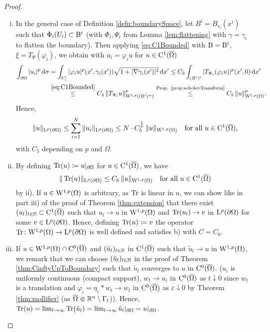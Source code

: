 \begin{proof}
\begin{enumerate}[i)]
  \item In the general case of Definition \ref{defn:boundarySpace}, let $B^i = B_{s_i}(x^i)$ such that $\Phi_i(U_i) \subset \mathrm{B}^i$ (with $\Phi_i, \Psi_i$ from Lemma \ref{lem:flattening} with $\gamma = \gamma_i$ to flatten the boundary).
    Then applying \eqref{eq:C1Bounded} with $\mathrm{B} = \mathrm{B}^i$, $\xi = T_\Psi(\varphi_i)$, we obtain with $u_i = \varphi_i u$ for $u \in \mathrm{C}^1(\overline\Omega)$
    \begin{align*}
      \int_{\partial\Omega} | u_i |^p \, {\operatorname{d}\!{\sigma}}
      &= \int_{U_i'} |\varphi_i u|^p (x', \gamma_i(x')) \sqrt{1 + |\nabla\gamma_i(x')|^2} \, {\operatorname{d}\!{x}}' 
      \leq C_3 \int_{(B^i)'} | T_{\Psi_i}(\varphi_i u) |^p (x', 0) \, {\operatorname{d}\!{x}}' \\
      &\overset{\eqref{eq:C1Bounded}}{\leq} C_4 \, \|T_{\Psi_i} u\|^p_{\mathrm{W}^{1,p}((\mathrm{B}^i)^+)} 
      \overset{\text{Prop. \ref{prop:sobolevTransform}}}{\leq} C_5 \, \|u\|^p_{\mathrm{W}^{1,p}(\Omega)}.
    \end{align*}
    Hence,
    $$
      \|u\|_{\mathrm{L}^p(\partial\Omega)} \leq \sum_{i = 1}^N \|u_i\|_{\mathrm{L}^p(\partial\Omega)} \leq N \cdot C_5^{\frac{1}{p}} \, \|u\|_{\mathrm{W}^{1,p}(\Omega)} \quad\text{for all } u \in \mathrm{C}^1(\overline\Omega),
    $$
    with $C_5$ depending on $p$ and $\Omega$.

  \item By defining $\operatorname{Tr}(u) \coloneqq u|_{\partial\Omega}$ for $u \in \mathrm{C}^1(\overline\Omega)$, we have
    $$
    \| \operatorname{Tr}(u)\|_{\mathrm{L}^p(\partial\Omega)} \leq C_6 \, \|u\|_{\mathrm{W}^{1,p}(\Omega)} \quad\text{for all } u \in \mathrm{C}^1(\overline\Omega)
    $$
    by ii).
    If $u \in \mathrm{W}^{1,p}(\Omega)$ is arbitrary, as $\operatorname{Tr}$ is linear in $u$, we can show like in part iii) of the proof of Theorem \ref{thm:extension} that there exist $(u_l)_{l \in \mathbb{N}} \subset \mathrm{C}^{1}(\overline\Omega)$ such that $u_l \to u$ in $\mathrm{W}^{1,p}(\Omega)$ and $\operatorname{Tr}(u_l) \to v$ in $\mathrm{L}^p(\partial\Omega)$ for some $v \in \mathrm{L}^p(\partial\Omega)$.
    Hence, defining $\operatorname{Tr}(u) \coloneqq v$ the operator $\operatorname{Tr} \colon \mathrm{W}^{1,p}(\Omega) \to \mathrm{L}^p(\partial\Omega)$ is well defined and satisfies b) with $C = C_6$.

  \item If $u \in \mathrm{W}^{1,p}(\Omega) \cap \mathrm{C}^0(\overline\Omega)$ and $(\tilde u_l)_{l \in \mathbb{N}}$ in $\mathrm{C}^1(\overline\Omega)$ such that $\tilde u_l \to u$ in $\mathrm{W}^{1,p}(\Omega)$, we remark that we can choose $(\tilde u_l)_{l \in \mathbb{N}}$ in the proof of Theorem \ref{thm:CinftyUpToBoundary} such that $\tilde u_l$ converges to $u$ in $\mathrm{C}^0(\overline\Omega)$.
    ($u_i$ is uniformly continuous (compact support), $w_t \to u_i$ in $\mathrm{C}^0(\overline\Omega)$ as $t \downarrow 0$ since $w_t$ is a translation and $\varphi_i = \eta_\varepsilon \ast w_t \to w_t$ in $\mathrm{C}^0(\overline\Omega)$ as $\varepsilon \downarrow 0$  by Theorem \ref{thm:mollifier} (as $\overline\Omega \Subset \mathbb{R}^n \setminus \Gamma_t$)).
    Hence, $\operatorname{Tr} (u) = \lim_{l \to \infty} \operatorname{Tr} (\tilde u_l) = \lim_{l \to \infty} \tilde u_l|_{\partial\Omega} = u|_{\partial \Omega}$. \qedhere
\end{enumerate}
\end{proof}

